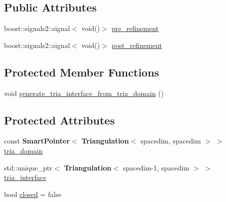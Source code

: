 \subsection*{Public Attributes}
\begin{DoxyCompactItemize}
\item 
boost\+::signals2\+::signal$<$ void()$>$ \hyperlink{class_triangulation_system_ad3b16b86e7cbe4800fb5a40114cbc5fb}{pre\+\_\+refinement}
\item 
boost\+::signals2\+::signal$<$ void()$>$ \hyperlink{class_triangulation_system_a8813b73cab76c8b77c47c00c39233f76}{post\+\_\+refinement}
\end{DoxyCompactItemize}
\subsection*{Protected Member Functions}
\begin{DoxyCompactItemize}
\item 
void \hyperlink{class_triangulation_system_aee020d825bdf108d69f8e5b71b7ad665}{generate\+\_\+tria\+\_\+interface\+\_\+from\+\_\+tria\+\_\+domain} ()
\end{DoxyCompactItemize}
\subsection*{Protected Attributes}
\begin{DoxyCompactItemize}
\item 
const {\bf Smart\+Pointer}$<$ {\bf Triangulation}$<$ spacedim, spacedim $>$ $>$ \hyperlink{class_triangulation_system_a68bafddc70652cb7c64701c74e86279f}{tria\+\_\+domain}
\item 
std\+::unique\+\_\+ptr$<$ {\bf Triangulation}$<$ spacedim-\/1, spacedim $>$ $>$ \hyperlink{class_triangulation_system_af145fb3f6a3b3ef9ed92111f9fca5b7d}{tria\+\_\+interface}
\item 
bool \hyperlink{class_triangulation_system_aef5ae937cc00b7954357bb8ae88b1f73}{closed} = false
\end{DoxyCompactItemize}
